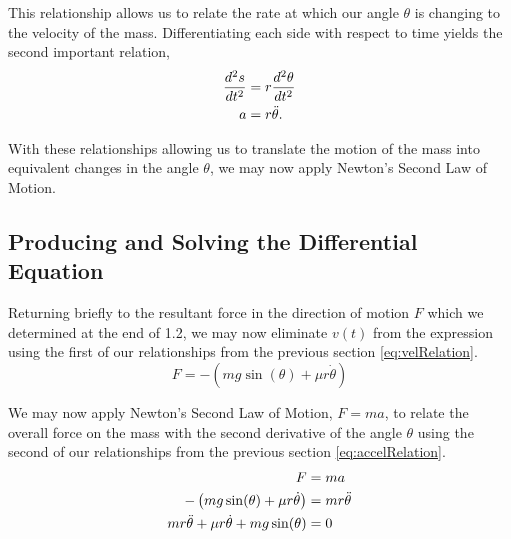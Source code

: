 \documentclass{article}
\begin{document}
This relationship allows us to relate the rate at which our angle $\theta$ is changing to the velocity of the mass. Differentiating each side with respect to time yields the second important relation,
\begin{align}
	\frac{d^2s}{dt^2} &= r\frac{d^2\theta}{dt^2} \notag \\
	a &= r\ddot{\theta}. \label{eq:accelRelation}
\end{align}

With these relationships allowing us to translate the motion of the mass into equivalent changes in the angle $\theta$, we may now apply Newton's Second Law of Motion.

\subsection{Producing and Solving the Differential Equation}

Returning briefly to the resultant force in the direction of motion $F$ which we determined at the end of 1.2, we may now eliminate $v(t)$ from the expression using the first of our relationships from the previous section \eqref{eq:velRelation}.
\begin{equation} \label{eq:resultant}
	F = -\left(mg\sin(\theta) + \mu r\dot{\theta}\right)
\end{equation}

We may now apply Newton's Second Law of Motion, $F = ma$, to relate the overall force on the mass with the second derivative of the angle $\theta$ using the second of our relationships from the previous section \eqref{eq:accelRelation}.
\begin{align}
	F &= ma \notag \\
	-\left(mg\sin(\theta) + \mu r\dot{\theta}\right) &= mr\ddot{\theta} \notag \\
	mr\ddot{\theta} + \mu r\dot{\theta} + mg\sin(\theta) &= 0 \label{eq:pendMainODE}
\end{align}
\end{document}
